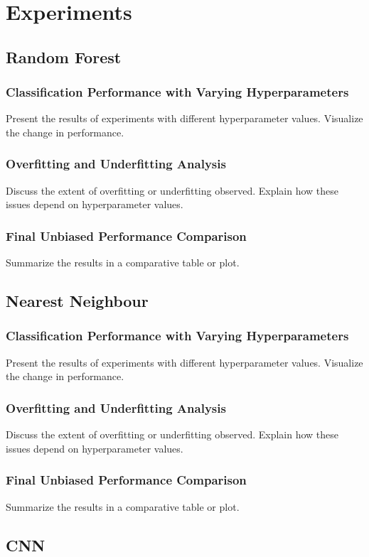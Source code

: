 \section{Experiments}

\subsection{Random Forest}
\subsubsection{Classification Performance with Varying Hyperparameters}
Present the results of experiments with different hyperparameter values. Visualize the change in performance.
\subsubsection{Overfitting and Underfitting Analysis}
Discuss the extent of overfitting or underfitting observed. Explain how these issues depend on hyperparameter values.
\subsubsection{Final Unbiased Performance Comparison}
Summarize the results in a comparative table or plot.

\subsection{Nearest Neighbour}
\subsubsection{Classification Performance with Varying Hyperparameters}
Present the results of experiments with different hyperparameter values. Visualize the change in performance.
\subsubsection{Overfitting and Underfitting Analysis}
Discuss the extent of overfitting or underfitting observed. Explain how these issues depend on hyperparameter values.
\subsubsection{Final Unbiased Performance Comparison}
Summarize the results in a comparative table or plot.

\subsection{CNN}
